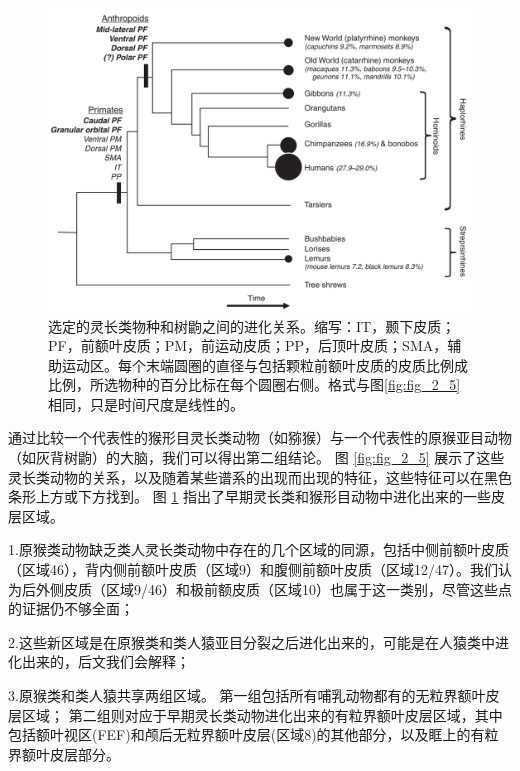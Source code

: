 \begin{figure}[!htb]
	\centering
	\includegraphics[width=0.8\linewidth]{image_pfc/Fig_2_6}
	\caption{选定的灵长类物种和树鼩之间的进化关系。缩写：IT，颞下皮质；PF，前额叶皮质；PM，前运动皮质；PP，后顶叶皮质；SMA，辅助运动区。每个末端圆圈的直径与包括颗粒前额叶皮质的皮质比例成比例，所选物种的百分比标在每个圆圈右侧。格式与图\ref{fig:fig_2_5}相同，只是时间尺度是线性的。\label{fig:fig_2_6}}
\end{figure}

通过比较一个代表性的猴形目灵长类动物（如猕猴）与一个代表性的原猴亚目动物（如灰背树鼩）的大脑，我们可以得出第二组结论。
图 \ref{fig:fig_2_5} 展示了这些灵长类动物的关系，以及随着某些谱系的出现而出现的特征，这些特征可以在黑色条形上方或下方找到。
图 \ref{fig:fig_2_6} 指出了早期灵长类和猴形目动物中进化出来的一些皮层区域。\par
1.原猴类动物缺乏类人灵长类动物中存在的几个区域的同源，包括中侧前额叶皮质（区域46），背内侧前额叶皮质（区域9）和腹侧前额叶皮质（区域12/47）。我们认为后外侧皮质（区域9/46）和极前额皮质（区域10）也属于这一类别，尽管这些点的证据仍不够全面；\par
2.这些新区域是在原猴类和类人猿亚目分裂之后进化出来的，可能是在人猿类中进化出来的，后文我们会解释；\par
3.原猴类和类人猿共享两组区域。
第一组包括所有哺乳动物都有的无粒界额叶皮层区域；
第二组则对应于早期灵长类动物进化出来的有粒界额叶皮层区域，其中包括额叶视区(FEF)和颅后无粒界额叶皮层(区域8)的其他部分，以及眶上的有粒界额叶皮层部分。

